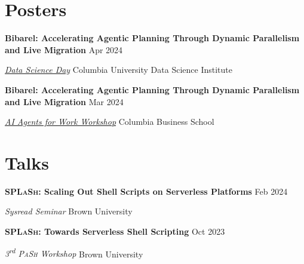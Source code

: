 \documentclass[margin,12pt]{resume}
\newcommand{\subsectionVSpace}{\vspace{3.5ex}\xspace}
\newcommand{\sectionVSpace}{\vspace{1ex}\xspace} %
\newcommand{\pash}{\textsc{PaSh}\xspace}
\newcommand{\sectionVSpaceCorrection}{\vspace{-3.5ex}} %
\newcommand{\splash}{\textsc{SPLaSh}\xspace}
\newcommand{\header}[1]{\textbf{#1}\xspace}
\newcommand{\event}[1]{\textit{#1}\xspace}
\newcommand{\ordinal}[1]{\textsuperscript{#1}\xspace}
\newcommand{\place}[1]{#1\xspace}
\newcommand{\poster}[1]{\header{#1}\xspace}
\newcommand{\singleDate}[1]{#1\xspace}
\newcommand{\talk}[1]{\header{#1}\xspace}
\newenvironment{rSubsection}{}{\par\subsectionVSpace}
\newenvironment{rSection}[1]{\sectionVSpaceCorrection\section{#1}\xspace}{\sectionVSpace\par}
\begin{document}
\begin{resume}
	\begin{rSection}{Posters}
		\begin{rSubsection}
			\poster{Bibarel: Accelerating Agentic Planning Through Dynamic Parallelism and Live Migration} \hfill Apr 2024

			\event{\href{https://datascience.columbia.edu/event/data-science-day-2025/}{Data Science Day}} \hfill \place{Columbia University Data Science Institute}
		\end{rSubsection}

		\begin{rSubsection}
			\poster{Bibarel: Accelerating Agentic Planning Through Dynamic Parallelism and Live Migration} \hfill Mar 2024

			\event{\href{https://daplab.cs.columbia.edu/workshop/}{AI Agents for Work Workshop}} \hfill \place{Columbia Business School}
		\end{rSubsection}
	\end{rSection}

	\begin{rSection}{Talks}


		\begin{rSubsection}
			\talk{\splash: Scaling Out Shell Scripts on Serverless Platforms} \hfill \singleDate{Feb 2024}

			\event{Sysread Seminar} \hfill \place{Brown University}
		\end{rSubsection}



		\begin{rSubsection}
			\talk{\splash: Towards Serverless Shell Scripting} \hfill \singleDate{Oct 2023}

			\event{3\ordinal{rd} \pash Workshop} \hfill \place{Brown University}
		\end{rSubsection}
	\end{rSection}


\end{resume}
\end{document}

